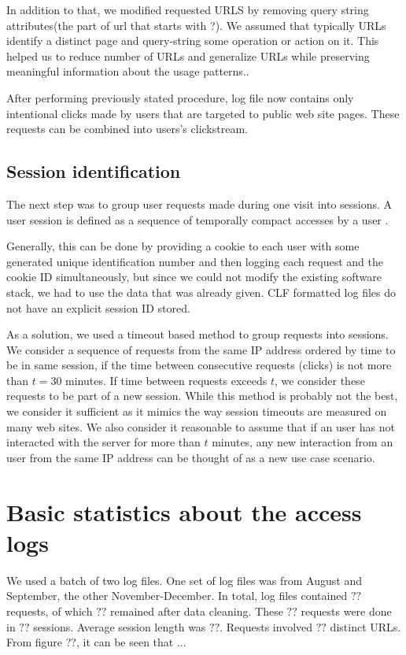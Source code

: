 \documentclass[english,a4paper]{article}
\begin{document}
In addition to that, we modified requested URLS by  removing query string attributes(the part of url that starts with ?).  We assumed that typically URLs identify a distinct page and query-string some operation or action on it. This helped us to reduce number of URLs and generalize URLs while preserving meaningful information about the usage patterns..

After performing previously stated procedure, log file now contains only intentional clicks made by users that are targeted to public web site pages. These requests can be combined into users's clickstream.

\subsection{Session identification}
The next step was to group user requests made during one visit into sessions. A user session is defined as a sequence of temporally compact accesses by a user \cite{on_mining_logs}.

Generally, this can be done by providing a cookie to each user with some generated unique identification number and then logging each request and the cookie ID simultaneously, but since we could not modify the existing software stack, we had to use the data that was already given. CLF formatted log files do not have an explicit session ID stored. 

As a solution, we used a timeout based method to group requests into sessions. We consider a sequence of requests from the same IP address ordered by time to be in
same session, if the time between consecutive requests (clicks) is not more
than $t = 30$ minutes. If time between requests exceeds $t$, we
consider these requests to be part of a new session. While this method is
probably not the best, we consider it sufficient as it mimics the way session
timeouts are measured on many web sites. We also consider it reasonable to
assume that if an user has not interacted with the server for more than $t$
minutes, any new interaction from an user from the same IP address can be
thought of as a new use case scenario.

\section{Basic statistics about the access logs} 
We used a batch of two log files. One set of log files was from August and September, the other November-December. In total, log files contained 
$??$ requests, of which $??$ remained after data cleaning. These $??$ requests were done in $??$ sessions. Average session length was $??$. Requests involved $??$ distinct URLs. From figure ??, it can be seen that ...
\end{document}
